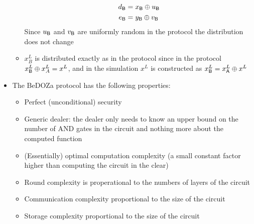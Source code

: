 \begin{itemize}
\begin{itemize}
\begin{align*}
            d_{\mathsf{B}} &= x_{\mathsf{B}} \oplus u_{\mathsf{B}} \\
            e_{\mathsf{B}} &= y_{\mathsf{B}} \oplus v_{\mathsf{B}} 
        \end{align*}
        Since $u_{\mathsf{B}}$ and $v_{\mathsf{B}}$ are uniformly random in the protocol the distribution does not change
        \item $x_B^L$ is distributed exactly as in the protocol since in the protocol $x_{\mathsf{B}}^L \oplus x_A^L = x^L$, and in the simulation $x^L$ is constructed as $x_{\mathsf{B}}^L = x_{\mathsf{A}}^L \oplus x^L$
    \end{itemize}
    \item The BeDOZa protocol has the following properties:
    \begin{itemize}
        \item[\checkmark] Perfect (unconditional) security
        \item[\checkmark] Generic dealer: the dealer only needs to know an upper bound on the number of AND gates in the circuit and nothing more about the computed function
        \item[\checkmark] (Essentially) optimal computation complexity (a small constant factor higher than computing the circuit in the clear)
        \item[\cross] Round complexity is properational to the numbers of layers of the circuit
        \item[\cross] Communication complexity proportional to the size of the circuit
        \item[\cross] Storage complexity proportional to the size of the circuit
    \end{itemize}
\end{itemize}

